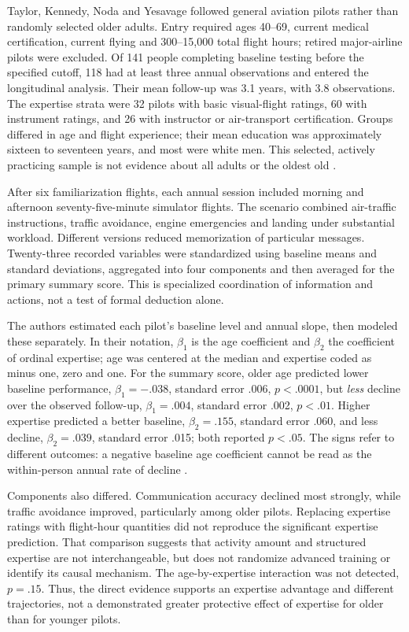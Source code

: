 Taylor, Kennedy, Noda and Yesavage followed general aviation pilots rather
than randomly selected older adults. Entry required ages 40--69, current
medical certification, current flying and 300--15,000 total flight hours;
retired major-airline pilots were excluded. Of 141 people completing
baseline testing before the specified cutoff, 118 had at least three
annual observations and entered the longitudinal analysis. Their mean
follow-up was 3.1 years, with 3.8 observations. The expertise strata were
32 pilots with basic visual-flight ratings, 60 with instrument ratings,
and 26 with instructor or air-transport certification. Groups differed in
age and flight experience; their mean education was approximately sixteen
to seventeen years, and most were white men. This selected, actively
practicing sample is not evidence about all adults or the oldest old
\cite[pp.~648--650, table~1]{TaylorKennedyNodaYesavage2007Pilot}.

After six familiarization flights, each annual session included morning
and afternoon seventy-five-minute simulator flights. The scenario combined
air-traffic instructions, traffic avoidance, engine emergencies and landing
under substantial workload. Different versions reduced memorization of
particular messages. Twenty-three recorded variables were standardized
using baseline means and standard deviations, aggregated into four
components and then averaged for the primary summary score. This is
specialized coordination of information and actions, not a test of
formal deduction alone.

The authors estimated each pilot's baseline level and annual slope, then
modeled these separately. In their notation, \(\beta_1\) is the
age coefficient and \(\beta_2\) the coefficient of ordinal expertise;
age was centered at the median and expertise coded as minus one, zero
and one. For the summary score, older age predicted lower baseline
performance, \(\beta_1=-.038\), standard error .006,
\(p<.0001\), but \emph{less} decline over the observed follow-up,
\(\beta_1=.004\), standard error .002, \(p<.01\).
Higher expertise predicted a better baseline, \(\beta_2=.155\),
standard error .060, and less decline, \(\beta_2=.039\), standard
error .015; both reported \(p<.05\). The signs refer to different
outcomes: a negative baseline age coefficient cannot be read as the
within-person annual rate of decline
\cite[pp.~650--651, table~2]{TaylorKennedyNodaYesavage2007Pilot}.

Components also differed. Communication accuracy declined most strongly,
while traffic avoidance improved, particularly among older pilots.
Replacing expertise ratings with flight-hour quantities did not reproduce
the significant expertise prediction. That comparison suggests that
activity amount and structured expertise are not interchangeable, but
does not randomize advanced training or identify its causal mechanism.
The age-by-expertise interaction was not detected, \(p=.15\).
Thus, the direct evidence supports an expertise advantage and different
trajectories, not a demonstrated greater protective effect of expertise
for older than for younger pilots.

